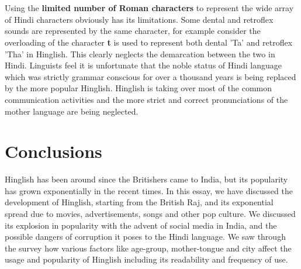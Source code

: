 \documentclass{article}
\begin{document}
\\\\
Using the \textbf{limited number of Roman characters} to represent the wide array of Hindi characters obviously has its limitations. Some dental and retroflex sounds are represented by the same character, for example consider the overloading of the character \textbf{t} is used to represent both dental 'Ta' and retroflex 'Tha' in Hinglish. This clearly neglects the demarcation between the two in Hindi.
\newpage
Linguists feel it is unfortunate that the noble status of Hindi language which was strictly grammar conscious for over a thousand years is being replaced by the more popular Hinglish. Hinglish is taking over most of the common communication activities and the more strict and correct pronunciations of the mother language are being neglected.

\section{Conclusions}

Hinglish has been around since the Britishers came to India, but its popularity has grown exponentially in the recent times. In this essay, we have discussed the development of Hinglish, starting from the British Raj, and its exponential spread due to movies, advertisements, songs and other pop culture. We discussed its explosion in popularity with the advent of social media in India, and the possible dangers of corruption it poses to the Hindi language. We saw through the survey how various factors like age-group, mother-tongue and city affect the usage and popularity of Hinglish including its readability and frequency of use.
\end{document}
